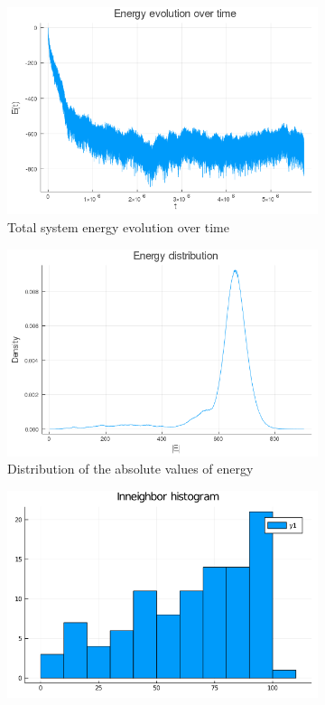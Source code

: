 \documentclass[12pt,openright,twoside]{book}
\begin{document}
\begin{appendices}
\begin{figure}[!htb]
\centering
\begin{subfigure}{0.47\linewidth}
    \includegraphics[width=\linewidth]{figures/2_2_t100/energy_evolution.png}
    \caption{Total system energy evolution over time}
\end{subfigure}
\begin{subfigure}{0.47\linewidth}
    \includegraphics[width=\linewidth]{figures/2_2_t100/energy_distribution.png}
    \caption{Distribution of the absolute values of energy}
\end{subfigure}
\begin{subfigure}{0.47\linewidth}
    \includegraphics[width=\linewidth]{figures/2_2_t100/InneighborHistogram_temp=100.png}

\end{subfigure}
\end{figure}
\end{appendices}
\end{document}
